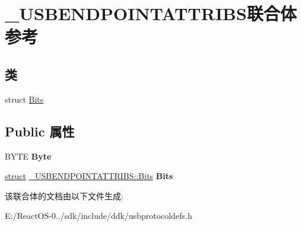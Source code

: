 \hypertarget{union___u_s_b_e_n_d_p_o_i_n_t_a_t_t_r_i_b_s}{}\section{\+\_\+\+U\+S\+B\+E\+N\+D\+P\+O\+I\+N\+T\+A\+T\+T\+R\+I\+B\+S联合体 参考}
\label{union___u_s_b_e_n_d_p_o_i_n_t_a_t_t_r_i_b_s}
\subsection*{类}
\begin{DoxyCompactItemize}
\item 
struct \hyperlink{struct___u_s_b_e_n_d_p_o_i_n_t_a_t_t_r_i_b_s_1_1_bits}{Bits}
\end{DoxyCompactItemize}
\subsection*{Public 属性}
\begin{DoxyCompactItemize}
\item 
\mbox{\label{union___u_s_b_e_n_d_p_o_i_n_t_a_t_t_r_i_b_s_ab14e3d664381631b710802c9486d6566}} 
B\+Y\+TE {\bfseries Byte}
\item 
\mbox{\label{union___u_s_b_e_n_d_p_o_i_n_t_a_t_t_r_i_b_s_a3222b05598bba5d54c1b2524a4ec17e7}} 
\hyperlink{interfacestruct}{struct} \hyperlink{struct___u_s_b_e_n_d_p_o_i_n_t_a_t_t_r_i_b_s_1_1_bits}{\+\_\+\+U\+S\+B\+E\+N\+D\+P\+O\+I\+N\+T\+A\+T\+T\+R\+I\+B\+S\+::\+Bits} {\bfseries Bits}
\end{DoxyCompactItemize}


该联合体的文档由以下文件生成\+:\begin{DoxyCompactItemize}
\item 
E\+:/\+React\+O\+S-\/0../sdk/include/ddk/usbprotocoldefs.\+h\end{DoxyCompactItemize}
